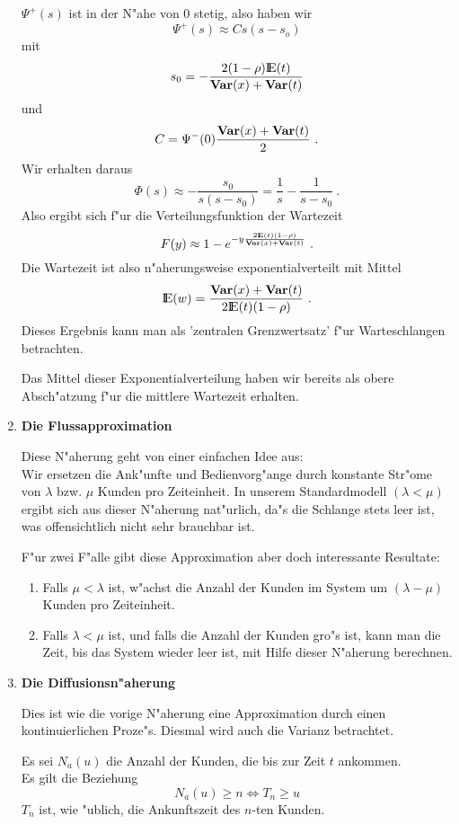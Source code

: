 \begin{enumerate}
$\Psi^{+}(s)$ ist in der N"ahe von $0$ stetig, also haben wir
\[\Psi^{+}(s) \approx Cs(s-s_{o})\]
mit
\[s_{0}=-\frac{2(1-\rho){\rm I\kern-0.2em E}(t)}{{\bf Var}(x)+{\bf Var}(t)} \]
und
\[C=\Psi^{-}(0)\frac{{\bf Var}(x)+{\bf Var}(t)}{2} ~. \]
Wir erhalten daraus
\[\Phi(s) \approx -\frac{s_{0}}{s(s-s_{0})}=\frac{1}{s}-\frac{1}{s-s_{0}} ~.\]
Also ergibt sich f"ur die Verteilungsfunktion der Wartezeit
\[ F(y) \approx 1 - e^{-y\frac{2{\rm I\kern-0.2em E}(t)(1-\rho)}{{\bf Var}(x)+{\bf Var}(t)}} ~.\]
Die Wartezeit ist also n"aherungsweise exponentialverteilt mit Mittel
\[{\rm I\kern-0.2em E}(w)=\frac{{\bf Var}(x)+{\bf Var}(t)}{2{\rm I\kern-0.2em E}(t)(1-\rho)} ~.\]
Dieses Ergebnis kann man als 'zentralen Grenzwertsatz' f"ur Warteschlangen betrachten.

Das Mittel dieser Exponentialverteilung haben wir bereits als obere
Absch"atzung f"ur die mittlere Wartezeit erhalten.

\item{\bf Die Flussapproximation}

Diese N"aherung geht von einer einfachen Idee aus:\\
Wir ersetzen die Ank"unfte und Bedienvorg"ange durch konstante Str"ome von $\lambda$ bzw. $\mu$ Kunden
pro Zeiteinheit. In unserem Standardmodell $(\lambda < \mu)$ ergibt sich aus dieser N"aherung nat"urlich, da"s die 
Schlange stets leer ist, was offensichtlich nicht sehr brauchbar ist.

F"ur zwei F"alle gibt diese Approximation aber doch interessante Resultate:
   \begin{enumerate}
   \item Falls $\mu < \lambda$ ist, w"achst die Anzahl der Kunden im System um $(\lambda - \mu)$ Kunden pro Zeiteinheit. 
   \item Falls $\lambda < \mu$ ist, und falls die Anzahl der Kunden gro"s ist, kann man die Zeit, bis das System wieder leer ist, mit Hilfe dieser
         N"aherung berechnen.
   \end{enumerate}

\item{\bf Die Diffusionsn"aherung}

Dies ist wie die vorige N"aherung eine Approximation durch einen kontinuierlichen Proze"s. Diesmal wird auch die Varianz betrachtet.

Es sei $N_{a}(u)$ die Anzahl der Kunden, die bis zur Zeit $t$ ankommen.\\
Es gilt die Beziehung
\[ N_{a}(u) \geq n \Leftrightarrow T_{n} \geq u \]
$T_{n}$ ist, wie "ublich, die Ankunftszeit des $n$-ten Kunden.


\end{enumerate}
